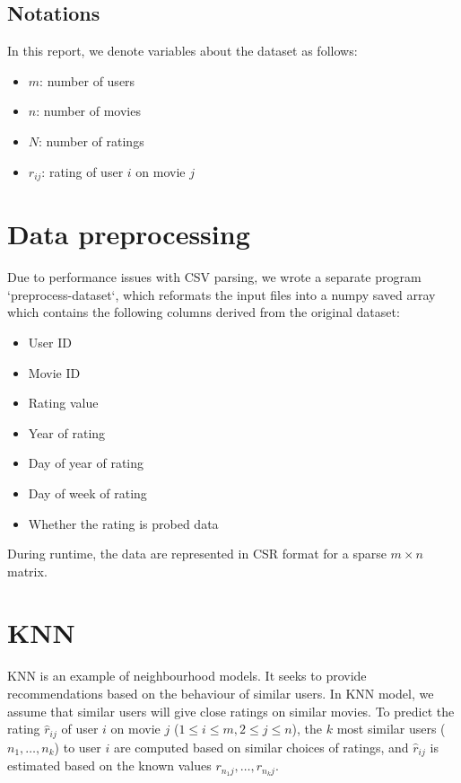 \documentclass[final]{cvpr}
\begin{document}
\subsection{Notations}
In this report, we denote variables about the dataset as follows:
\begin{itemize}
	\item $m$: number of users
	\item $n$: number of movies
	\item $N$: number of ratings
	\item $r_{ij}$: rating of user $i$ on movie $j$
\end{itemize}

\section{Data preprocessing}
Due to performance issues with CSV parsing, we wrote a separate program `preprocess-dataset`,
which reformats the input files into a numpy saved array
which contains the following columns derived from the original dataset:

\begin{itemize}
	\item User ID
	\item Movie ID
	\item Rating value
	\item Year of rating
	\item Day of year of rating
	\item Day of week of rating
	\item Whether the rating is probed data
\end{itemize}

During runtime, the data are represented in \ac{CSR} format
for a sparse $m \times n$ matrix.

\section{\ac{KNN}}
\ac{KNN} is an example of neighbourhood models.
It seeks to provide recommendations based on the behaviour of similar users.
In \ac{KNN} model, we assume that similar users will give close ratings on similar movies.
To predict the rating $\hat r_{ij}$ of user $i$ on movie $j$ ($1 \le i \le m, 2 \le j \le n$),
the $k$ most similar users ($n_1, \ldots, n_k$) to user $i$ are computed based on similar choices of ratings,
and $\hat r_{ij}$ is estimated based on the known values $r_{n_1j}, \ldots, r_{n_kj}$.
\end{document}
